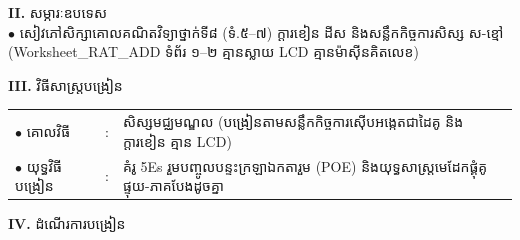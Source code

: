 \documentclass[a4paper,10pt]{article}
\newcommand{\en}[1]{{\TimesEn #1}}
\begin{document}
{%
\textbf{II.} {\muol សម្ភារៈឧបទេស}\\[1pt]
\hspace*{0.55cm}$\bullet$ \hspace{0.35cm} សៀវភៅសិក្សាគោលគណិតវិទ្យាថ្នាក់ទី៨ (ទំ.៥–៧) ក្ដារខៀន ដីស និងសន្លឹកកិច្ចការសិស្ស ស-ខ្មៅ (\en{Worksheet\_RAT\_ADD} ទំព័រ ១–២ គ្មានស្លាយ \en{LCD} គ្មានម៉ាស៊ីនគិតលេខ)

\vspace{2pt}

\textbf{III.} {\muol វិធីសាស្រ្តបង្រៀន}\\[1pt]
\hspace*{0.45cm}%
\begin{tabular}{@{}l l L{14.85cm}@{}}
  $\bullet$ \hspace{0.25cm} គោលវិធី & : & សិស្សមជ្ឈមណ្ឌល (បង្រៀនតាមសន្លឹកកិច្ចការស៊ើបអង្កេតជាដៃគូ និងក្ដារខៀន គ្មាន \en{LCD}) \\
  $\bullet$ \hspace{0.25cm} យុទ្ធវិធីបង្រៀន & : & គំរូ \en{5Es} រួមបញ្ចូលបន្ទះក្រឡាឯកតារួម \en{(POE)} និងយុទ្ធសាស្ត្រមេដែកផ្គុំគូផ្ទុយ-ភាគបែងដូចគ្នា \\
\end{tabular}
}

\vspace{2pt}

\textbf{IV.} {\muol ដំណើរការបង្រៀន}

\vspace{1pt}
\end{document}
